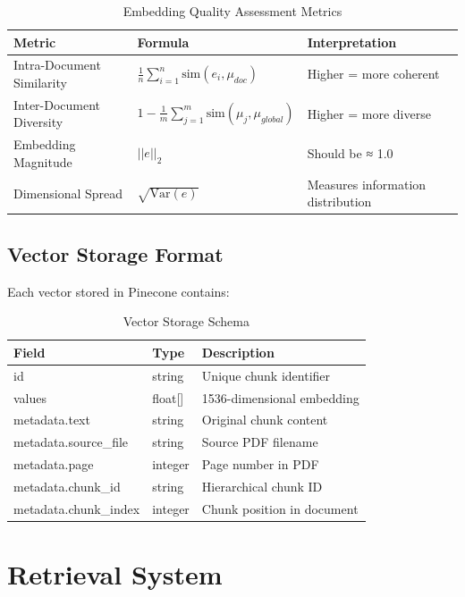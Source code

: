 \documentclass[12pt,a4paper]{article}
\begin{document}
\begin{table}[H]
\centering
\begin{tabular}{@{}lll@{}}
\toprule
\textbf{Metric} & \textbf{Formula} & \textbf{Interpretation} \\
\midrule
Intra-Document Similarity & $\frac{1}{n} \sum_{i=1}^{n} \text{sim}(e_i, \mu_{doc})$ & Higher = more coherent \\
Inter-Document Diversity & $1 - \frac{1}{m} \sum_{j=1}^{m} \text{sim}(\mu_j, \mu_{global})$ & Higher = more diverse \\
Embedding Magnitude & $||e||_2$ & Should be ≈ 1.0 \\
Dimensional Spread & $\sqrt{\text{Var}(e)}$ & Measures information distribution \\
\bottomrule
\end{tabular}
\caption{Embedding Quality Assessment Metrics}
\end{table}

\subsection{Vector Storage Format}

Each vector stored in Pinecone contains:

\begin{table}[H]
\centering
\begin{tabular}{@{}lll@{}}
\toprule
\textbf{Field} & \textbf{Type} & \textbf{Description} \\
\midrule
id & string & Unique chunk identifier \\
values & float[] & 1536-dimensional embedding \\
metadata.text & string & Original chunk content \\
metadata.source\_file & string & Source PDF filename \\
metadata.page & integer & Page number in PDF \\
metadata.chunk\_id & string & Hierarchical chunk ID \\
metadata.chunk\_index & integer & Chunk position in document \\
\bottomrule
\end{tabular}
\caption{Vector Storage Schema}
\end{table}

\section{Retrieval System}
\end{document}
